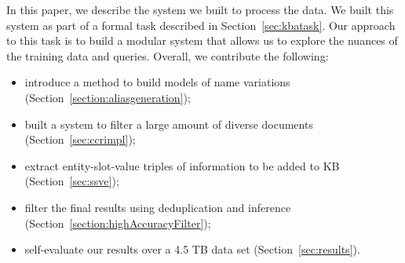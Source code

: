 In this paper, we describe the system we built to process the data.
We built this system as part of a formal task described in Section~\ref{sec:kbatask}.
Our approach to this task is to build a modular system
that allows us to explore the nuances of the training data and queries.
Overall, we contribute the following:
\begin{itemize}[noitemsep,nolistsep]
\item introduce a method to build models of name variations (Section~\ref{section:aliasgeneration});
\item built a system to filter a large amount of diverse documents (Section~\ref{sec:ccrimpl});
\item extract entity-slot-value triples of information to be added to KB (Section~\ref{sec:ssve});
\item filter the final results using deduplication and inference (Section~\ref{section:highAccuracyFilter});
\item self-evaluate our results over a 4.5 TB data set (Section~\ref{sec:results}).
\end{itemize}





